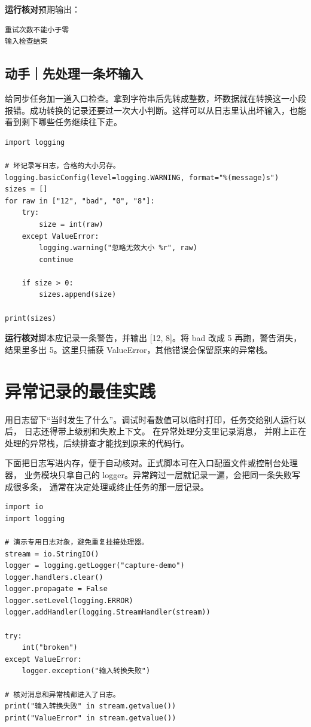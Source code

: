 \documentclass[UTF8,a4paper,oneside,openany,fontset=none,11pt]{ctexbook}
\newcommand{\code}[1]{\texttt{\detokenize{#1}}}
\begin{document}
\textbf{运行核对}\enspace 预期输出：
\begin{lstlisting}[language={},numbers=none]
重试次数不能小于零
输入检查结束
\end{lstlisting}

\par

\subsection*{动手｜先处理一条坏输入}

给同步任务加一道入口检查。拿到字符串后先转成整数，坏数据就在转换这一小段报错。成功转换的记录还要过一次大小判断。这样可以从日志里认出坏输入，也能看到剩下哪些任务继续往下走。

\begin{lstlisting}[title={\code{scan_sizes.py}}]
import logging

# 坏记录写日志，合格的大小另存。
logging.basicConfig(level=logging.WARNING, format="%(message)s")
sizes = []
for raw in ["12", "bad", "0", "8"]:
    try:
        size = int(raw)
    except ValueError:
        logging.warning("忽略无效大小 %r", raw)
        continue

    if size > 0:
        sizes.append(size)

print(sizes)
\end{lstlisting}

\textbf{运行核对}\enspace 脚本应记录一条警告，并输出 [12, 8]。将 bad 改成 5 再跑，警告消失，结果里多出 5。这里只捕获 ValueError，其他错误会保留原来的异常栈。

\section{异常记录的最佳实践}

用日志留下“当时发生了什么”。调试时看数值可以临时打印，任务交给别人运行以后，
日志还得带上级别和失败上下文。\code{logging.exception()} 在异常处理分支里记录消息，
并附上正在处理的异常栈，后续排查才能找到原来的代码行。

下面把日志写进内存，便于自动核对。正式脚本可在入口配置文件或控制台处理器，
业务模块只拿自己的 logger。异常跨过一层就记录一遍，会把同一条失败写成很多条，
通常在决定处理或终止任务的那一层记录。


\begin{lstlisting}[title={\code{capture_error.py}}]
import io
import logging

# 演示专用日志对象，避免重复挂接处理器。
stream = io.StringIO()
logger = logging.getLogger("capture-demo")
logger.handlers.clear()
logger.propagate = False
logger.setLevel(logging.ERROR)
logger.addHandler(logging.StreamHandler(stream))

try:
    int("broken")
except ValueError:
    logger.exception("输入转换失败")

# 核对消息和异常栈都进入了日志。
print("输入转换失败" in stream.getvalue())
print("ValueError" in stream.getvalue())
\end{lstlisting}
\end{document}
